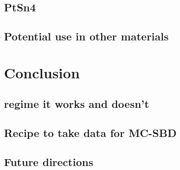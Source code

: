 \subsection{PtSn4}
\subsection{Potential use in other materials}

\section{Conclusion}
\subsection{regime it works and doesn't}
\subsection{Recipe to take data for MC-SBD}
\subsection{Future directions}